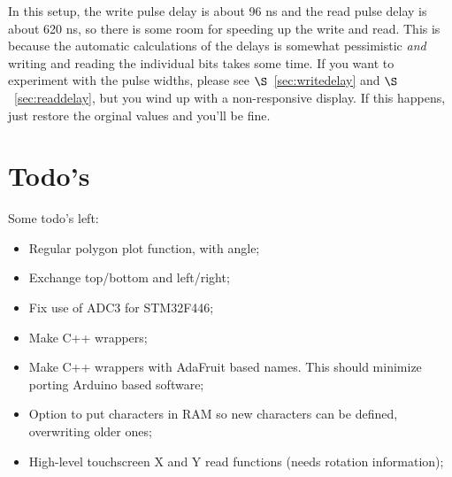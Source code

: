\documentclass[12pt]{article}
\begin{document}
In this setup, the write pulse delay is about 96 ns and the read pulse delay is about 620 ns, so there is some room for speeding up the write and read. This is because the automatic calculations of the delays is somewhat pessimistic \textsl{and} writing and reading the individual bits takes some time. If you want to experiment with the pulse widths, please see $\S$~\ref{sec:writedelay} and $\S$~\ref{sec:readdelay}, but you wind up with a non-responsive display. If this happens, just restore the orginal values and you'll be fine.

\section{Todo's}
Some todo's left:

\begin{itemize}
\item Regular polygon plot function, with angle;
\item Exchange top/bottom and left/right;
\item Fix use of ADC3 for STM32F446;
\item Make C++ wrappers;
\item Make C++ wrappers with AdaFruit based names. This should minimize porting Arduino based software;
\item Option to put characters in RAM so new characters can be defined, overwriting older ones;
\item High-level touchscreen X and Y read functions (needs rotation information);
\end{itemize}

\cleardoublepage
{}
{}

\printindex
\end{document}
